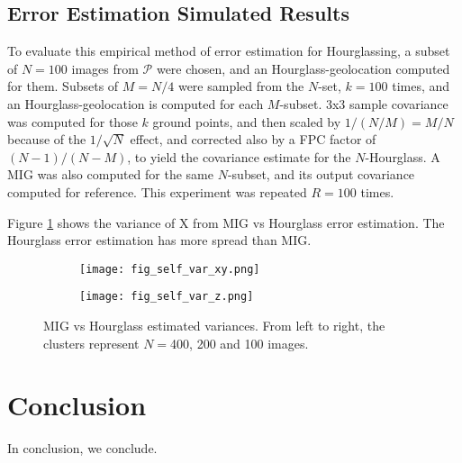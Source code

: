 \documentclass[10pt]{amsart}
\newcommand{\Pimg}{\mathcal{P}}
\begin{document}
\subsection{\label{hsimulation}Error Estimation Simulated Results}
To evaluate this empirical method of error estimation for Hourglassing, a subset
of $N=100$ images from $\Pimg$ were chosen, and an Hourglass-geolocation
computed for them. Subsets of $M=N/4$ were sampled from the $N$-set, $k=100$
times, and an Hourglass-geolocation is computed for each $M$-subset. 3x3 sample
covariance was computed for those $k$ ground points, and then scaled by
$1/(N/M)=M/N$ because of the $1/\sqrt{N}$ effect, and corrected also by a FPC
factor of $(N-1)/(N-M)$, to yield the covariance estimate for the
$N$-Hourglass. A MIG was also computed for the same $N$-subset, and its output
covariance computed for reference. This experiment was repeated $R=100$ times.

Figure \ref{fig:mig_vs_hourglass_var} shows the variance of X from MIG vs
Hourglass error estimation. The Hourglass error estimation has more spread than MIG.

\begin{figure}
\centering
\begin{subfigure}{.5\textwidth}
  \centering
  \texttt{[image: fig\_self\_var\_xy.png]}
\end{subfigure}%
\begin{subfigure}{.5\textwidth}
  \centering
  \texttt{[image: fig\_self\_var\_z.png]}
\end{subfigure}
\caption{\label{fig:mig_vs_hourglass_var}MIG vs Hourglass estimated
  variances. From left to right, the clusters represent $N=$400, 200 and 100
  images.}
\end{figure}

\section{Conclusion}
In conclusion, we conclude.
\end{document}
